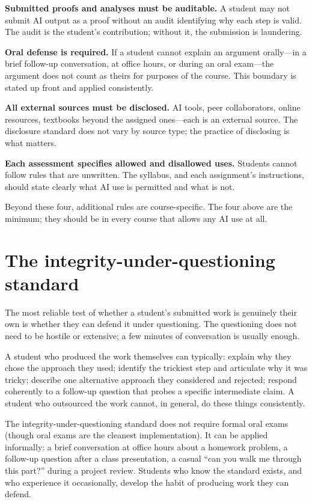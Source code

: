 \documentclass[11pt]{book}
\begin{document}
\textbf{Submitted proofs and analyses must be auditable.} A student may not submit AI output as a proof without an audit identifying why each step is valid. The audit is the student's contribution; without it, the submission is laundering.

\textbf{Oral defense is required.} If a student cannot explain an argument orally---in a brief follow-up conversation, at office hours, or during an oral exam---the argument does not count as theirs for purposes of the course. This boundary is stated up front and applied consistently.

\textbf{All external sources must be disclosed.} AI tools, peer collaborators, online resources, textbooks beyond the assigned ones---each is an external source. The disclosure standard does not vary by source type; the practice of disclosing is what matters.

\textbf{Each assessment specifies allowed and disallowed uses.} Students cannot follow rules that are unwritten. The syllabus, and each assignment's instructions, should state clearly what AI use is permitted and what is not.

Beyond these four, additional rules are course-specific. The four above are the minimum; they should be in every course that allows any AI use at all.

\section{The integrity-under-questioning standard}

The most reliable test of whether a student's submitted work is genuinely their own is whether they can defend it under questioning. The questioning does not need to be hostile or extensive; a few minutes of conversation is usually enough.

A student who produced the work themselves can typically: explain why they chose the approach they used; identify the trickiest step and articulate why it was tricky; describe one alternative approach they considered and rejected; respond coherently to a follow-up question that probes a specific intermediate claim. A student who outsourced the work cannot, in general, do these things consistently.

The integrity-under-questioning standard does not require formal oral exams (though oral exams are the cleanest implementation). It can be applied informally: a brief conversation at office hours about a homework problem, a follow-up question after a class presentation, a casual ``can you walk me through this part?'' during a project review. Students who know the standard exists, and who experience it occasionally, develop the habit of producing work they can defend.
\end{document}
